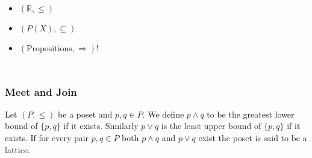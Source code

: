 \documentclass{beamer}
\begin{document}
\begin{frame}	
	

	\begin{example}	
		\begin{columns}	
	
			\begin{itemize}
	
				\item $(\mathbb{R},\leq)$
				\item $(P(X),\subseteq)$
				\item $(\text{Propositions},\Rightarrow)$!	
	
			\end{itemize}
		
		
		\end{columns}
	\end{example}

\end{frame}	

\begin{frame}

	\frametitle{Meet and Join}
	
	\begin{definition}
	
		Let $(P,\leq)$ be a poset and $p,q\in P$. We define $p\wedge q$ to be the greatest lower bound of $\{p,q\}$ if it exists. Similarly $p\vee q$ is the least upper bound of $\{p,q\}$ if it exists.	If for every pair $p,q\in P$ both $p\wedge q$ and $p\vee q$ exist the poset is said to be a lattice.
	
	\end{definition}

\end{frame}
\end{document}
